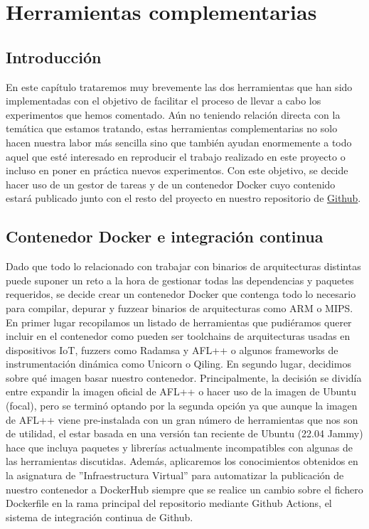 \chapter{Herramientas complementarias}
\label{herramientas}
\section{Introducción}
En este capítulo trataremos muy brevemente las dos herramientas que han sido implementadas con el objetivo de facilitar el proceso de llevar a cabo los 
experimentos que hemos comentado. Aún no teniendo relación directa con la temática que estamos tratando, estas herramientas complementarias no solo 
hacen nuestra labor más sencilla sino que también ayudan enormemente a todo aquel que esté interesado en reproducir el trabajo realizado en este proyecto
o incluso en poner en práctica nuevos experimentos. Con este objetivo, se decide hacer uso de un gestor de tareas y de un contenedor Docker cuyo contenido estará
publicado junto con el resto del proyecto en nuestro repositorio de \href{https://github.com/Olasergiolas/TFG}{Github}.

\section{Contenedor Docker e integración continua}
Dado que todo lo relacionado con trabajar con binarios de arquitecturas distintas puede suponer un reto a la hora de gestionar todas las dependencias
y paquetes requeridos, se decide crear un contenedor Docker que contenga todo lo necesario para compilar, depurar y fuzzear binarios de arquitecturas como 
ARM o MIPS. En primer lugar recopilamos un listado de herramientas que pudiéramos querer incluir en el contenedor como pueden ser toolchains de arquitecturas
usadas en dispositivos IoT, 
fuzzers como Radamsa y AFL++ o algunos frameworks de instrumentación dinámica como Unicorn o Qiling. En segundo lugar, decidimos sobre qué
imagen basar nuestro contenedor. Principalmente, la decisión se dividía entre expandir la imagen oficial de AFL++ o hacer uso de la imagen de Ubuntu (focal), pero se 
terminó optando por la segunda opción ya que aunque la imagen de AFL++ viene pre-instalada con un gran número de herramientas que nos son de utilidad, el 
estar basada en una versión tan reciente de Ubuntu (22.04 Jammy) hace que incluya paquetes y librerías actualmente incompatibles con algunas de las 
herramientas discutidas. Además, aplicaremos los conocimientos obtenidos en la asignatura de ''Infraestructura Virtual'' para automatizar la publicación de nuestro
contenedor a DockerHub siempre que se realice un cambio sobre el fichero Dockerfile en la rama principal del repositorio mediante Github Actions,
el sistema de integración continua de Github.

